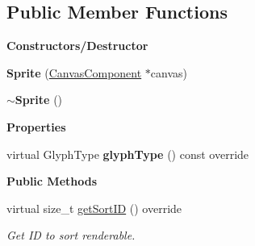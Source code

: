 \subsection*{Public Member Functions}
\begin{Indent}\textbf{ Constructors/\+Destructor}\par
\begin{DoxyCompactItemize}
\item 
\mbox{\label{classrev_1_1_sprite_a4ef1a1d1c1b3630459b6f6415b6cb541}} 
{\bfseries Sprite} (\mbox{\hyperlink{classrev_1_1_canvas_component}{Canvas\+Component}} $\ast$canvas)
\item 
\mbox{\label{classrev_1_1_sprite_a5d78acfb1a7978506c9c1971cb15b878}} 
{\bfseries $\sim$\+Sprite} ()
\end{DoxyCompactItemize}
\end{Indent}
\begin{Indent}\textbf{ Properties}\par
\begin{DoxyCompactItemize}
\item 
\mbox{\label{classrev_1_1_sprite_a338ebaa5968f232f09f0b7306f46ccf5}} 
virtual Glyph\+Type {\bfseries glyph\+Type} () const override
\end{DoxyCompactItemize}
\end{Indent}
\begin{Indent}\textbf{ Public Methods}\par
\begin{DoxyCompactItemize}
\item 
\mbox{\label{classrev_1_1_sprite_a202531da8f848f3218a08e78d811f5eb}} 
virtual size\+\_\+t \mbox{\hyperlink{classrev_1_1_sprite_a202531da8f848f3218a08e78d811f5eb}{get\+Sort\+ID}} () override
\begin{DoxyCompactList}\small\item\em Get ID to sort renderable. \end{DoxyCompactList}\end{DoxyCompactItemize}
\end{Indent}
